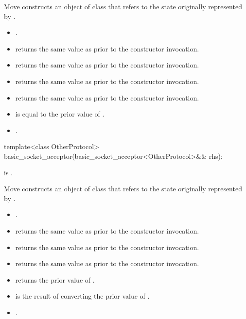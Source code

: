 \begin{itemdescr}
\pnum
\effects Move constructs an object of class  that refers to the state originally represented by .

\pnum
\postconditions
\begin{itemize}
\item
{}.
\item
{} returns the same value as  prior to the constructor invocation.
\item
{} returns the same value as  prior to the constructor invocation.
\item
{} returns the same value as  prior to the constructor invocation.
\item
{} returns the same value as  prior to the constructor invocation.
\item
{} is equal to the prior value of .
\item
{}.
\end{itemize}
\end{itemdescr}

\begin{itemdecl}
template<class OtherProtocol>
  basic_socket_acceptor(basic_socket_acceptor<OtherProtocol>&& rhs);
\end{itemdecl}

\begin{itemdescr}
\pnum
\constraints {} is .

\pnum
\effects Move constructs an object of class  that refers to the state originally represented by .

\pnum
\postconditions
\begin{itemize}
\item
{}.
\item
{} returns the same value as  prior to the constructor invocation.
\item
{} returns the same value as  prior to the constructor invocation.
\item
{} returns the same value as  prior to the constructor invocation.
\item
{} returns the prior value of .
\item
{} is the result of converting the prior value of .
\item
{}.
\end{itemize}
\end{itemdescr}



